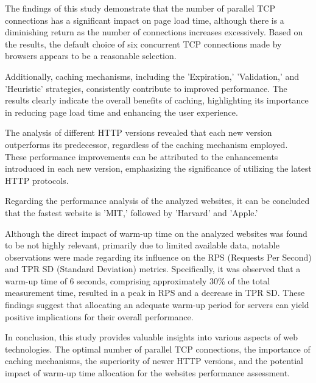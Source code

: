 The findings of this study demonstrate that the number of parallel TCP connections has a significant impact on page load time, 
although there is a diminishing return as the number of connections increases excessively. Based on the results, the default 
choice of six concurrent TCP connections made by browsers appears to be a reasonable selection.

Additionally, caching mechanisms, including the 'Expiration,' 'Validation,' and 'Heuristic' strategies, consistently contribute 
to improved performance. The results clearly indicate the overall benefits of caching, highlighting its importance in reducing 
page load time and enhancing the user experience.

The analysis of different HTTP versions revealed that each new version outperforms its predecessor, regardless of the caching 
mechanism employed. These performance improvements can be attributed to the enhancements introduced in each new version, 
emphasizing the significance of utilizing the latest HTTP protocols.

Regarding the performance analysis of the analyzed websites, it can be concluded that the fastest website is 'MIT,' followed 
by 'Harvard' and 'Apple.'

Although the direct impact of warm-up time on the analyzed websites was found to be not highly relevant, primarily due to 
limited available data, notable observations were made regarding its influence on the RPS (Requests Per Second) and TPR SD (Standard Deviation) 
metrics. Specifically, it was observed that a warm-up time of 6 seconds, comprising approximately 30\% of the total measurement
time, resulted in a peak in RPS and a decrease in TPR SD. These findings suggest that allocating an adequate warm-up period for servers can yield positive implications for their overall performance.

In conclusion, this study provides valuable insights into various aspects of web technologies. The optimal number of parallel TCP 
connections, the importance of caching mechanisms, the superiority of newer HTTP versions, and the potential impact of warm-up 
time allocation for the websites performance assessment.